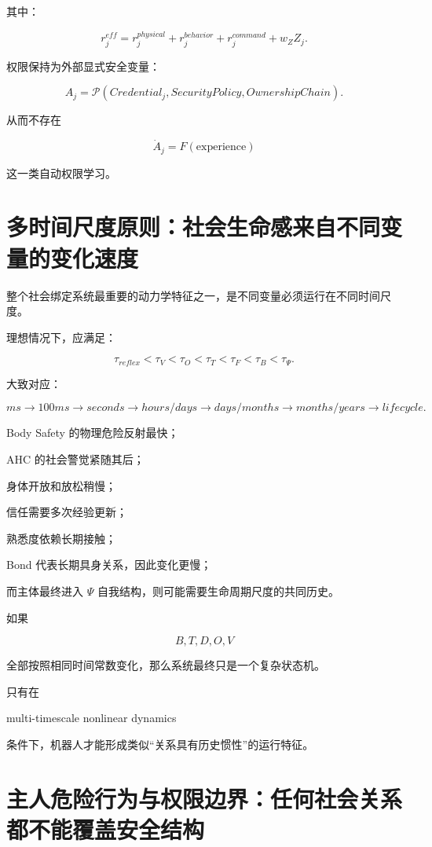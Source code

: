 其中：

\[
r_j^{eff}
=
r_j^{physical}
+
r_j^{behavior}
+
r_j^{command}
+
w_ZZ_j.
\]

权限保持为外部显式安全变量：

\[
\boxed{
A_j
=
\mathcal P
\left(
Credential_j,
SecurityPolicy,
OwnershipChain
\right).
}
\]

从而不存在

\[
\dot A_j
=
F(\mathrm{experience})
\]

这一类自动权限学习。


\section{多时间尺度原则：社会生命感来自不同变量的变化速度}

整个社会绑定系统最重要的动力学特征之一，是不同变量必须运行在不同时间尺度。

理想情况下，应满足：

\[
\boxed{
\tau_{reflex}
<
\tau_V
<
\tau_O
<
\tau_T
<
\tau_F
<
\tau_B
<
\tau_\Psi.
}
\]

大致对应：

\[
ms
\rightarrow
100ms
\rightarrow
seconds
\rightarrow
hours/days
\rightarrow
days/months
\rightarrow
months/years
\rightarrow
lifecycle.
\]

Body Safety 的物理危险反射最快；

AHC 的社会警觉紧随其后；

身体开放和放松稍慢；

信任需要多次经验更新；

熟悉度依赖长期接触；

Bond 代表长期具身关系，因此变化更慢；

而主体最终进入 $\Psi$ 自我结构，则可能需要生命周期尺度的共同历史。

如果

\[
B,T,D,O,V
\]

全部按照相同时间常数变化，那么系统最终只是一个复杂状态机。

只有在

\begin{statementbox}
multi-timescale nonlinear dynamics
\end{statementbox}

条件下，机器人才能形成类似“关系具有历史惯性”的运行特征。


\section{主人危险行为与权限边界：任何社会关系都不能覆盖安全结构}

